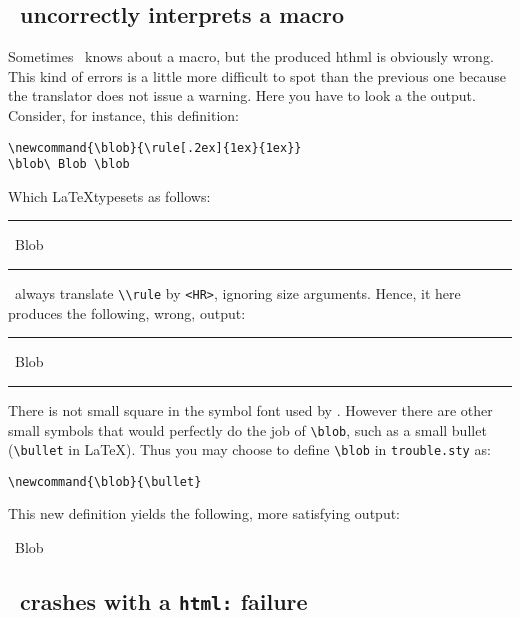 \documentclass{article}
\newenvironment{latexout}{\begin{htmlout}}{\end{htmlout}}
\begin{document}
\subsection{\htmlgen\ uncorrectly interprets a macro}

Sometimes \htmlgen\ knows about a macro, but the produced hthml
is obviously wrong.
This kind of errors is a little more difficult to spot than the
previous one because the translator does not issue a warning. Here you
have to look a the output.
Consider, for instance, this definition:
\begin{verbatim}
\newcommand{\blob}{\rule[.2ex]{1ex}{1ex}}
\blob\ Blob \blob
\end{verbatim}
Which \LaTeX typesets as follows:
\begin{latexout}
\begin{htmlonly}
\begin{toimage}\newcommand{\blob}{\rule[.2ex]{1ex}{1ex}}
\blob\ Blob \blob
\end{toimage}
\imageflush
\end{htmlonly}
\end{latexout}
\htmlgen\ always translate \verb+\\rule+ by \verb+<HR>+, ignoring size
arguments.
Hence, it here produces the following, wrong, output:
\begin{htmlout}\newcommand{\blob}{\rule[.2ex]{1ex}{1ex}}
\begin{htmlonly}
\blob\ Blob \blob
\end{htmlonly}
\end{htmlout}

There is not small square in the symbol font used by \htmlgen.
However there are other small symbols that would perfectly do the job
of \verb+\blob+, such as a small bullet (\verb+\bullet+ in \LaTeX).
Thus you may choose to define \verb+\blob+ in \verb+trouble.sty+ as:
\begin{verbatim}
\newcommand{\blob}{\bullet}
\end{verbatim}
This new definition yields the following, more satisfying output:
\begin{htmlout}\newcommand{\blob}{\bullet}
\begin{htmlonly}
\blob\ Blob \blob
\end{htmlonly}
\end{htmlout}

\subsection{\htmlgen\ crashes with a \protect\texttt{html:} failure}
\end{document}
